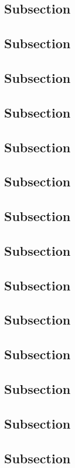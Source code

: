 \documentclass[paper=a5,twoside,fontsize=10pt, DIV=calc, headings=small,bibliography=totoc, listof=totoc]{scrbook}
\begin{document}
\subsection{Subsection}
\subsection{Subsection}
\subsection{Subsection}
\subsection{Subsection}
\subsection{Subsection}
\subsection{Subsection}
\subsection{Subsection}
\subsection{Subsection}
\subsection{Subsection}
\subsection{Subsection}
\subsection{Subsection}
\subsection{Subsection}
\subsection{Subsection}
\subsection{Subsection}
\end{document}
